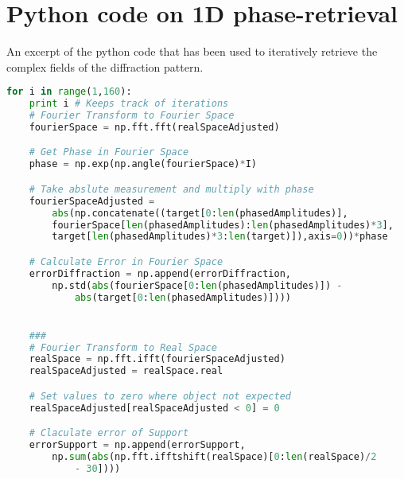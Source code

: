 \section{Python code on 1D phase-retrieval}\label{sec:1d-phase-retrieval-code}
An excerpt of the python code that has been used to iteratively retrieve the complex fields of the diffraction pattern.
\begin{lstlisting}[language=Python,frame=single,basicstyle=\footnotesize]
for i in range(1,160):
	print i # Keeps track of iterations
	# Fourier Transform to Fourier Space
	fourierSpace = np.fft.fft(realSpaceAdjusted)

	# Get Phase in Fourier Space
	phase = np.exp(np.angle(fourierSpace)*I)

	# Take abslute measurement and multiply with phase
	fourierSpaceAdjusted = 
		abs(np.concatenate((target[0:len(phasedAmplitudes)],
		fourierSpace[len(phasedAmplitudes):len(phasedAmplitudes)*3],
		target[len(phasedAmplitudes)*3:len(target)]),axis=0))*phase

	# Calculate Error in Fourier Space
	errorDiffraction = np.append(errorDiffraction,
		np.std(abs(fourierSpace[0:len(phasedAmplitudes)]) - 
			abs(target[0:len(phasedAmplitudes)])))


	###
	# Fourier Transform to Real Space
	realSpace = np.fft.ifft(fourierSpaceAdjusted)
	realSpaceAdjusted = realSpace.real

	# Set values to zero where object not expected
	realSpaceAdjusted[realSpaceAdjusted < 0] = 0

	# Claculate error of Support
	errorSupport = np.append(errorSupport,
		np.sum(abs(np.fft.ifftshift(realSpace)[0:len(realSpace)/2 
			- 30])))
\end{lstlisting}
\fi
%
%
%
%
%
%